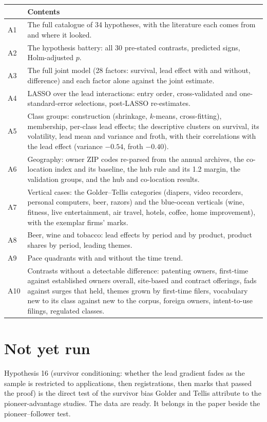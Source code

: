 \begin{longtable}{>{\raggedright\arraybackslash}p{0.8cm}>{\raggedright\arraybackslash}p{12.8cm}}
\toprule
& Contents \\
\midrule
\endhead
A1 & The full catalogue of 34 hypotheses, with the literature each comes from and where it looked. \\
A2 & The hypothesis battery: all 30 pre-stated contrasts, predicted signs, Holm-adjusted $p$. \\
A3 & The full joint model (28 factors: survival, lead effect with and without, difference) and each factor alone against the joint estimate. \\
A4 & LASSO over the lead interactions: entry order, cross-validated and one-standard-error selections, post-LASSO re-estimates. \\
A5 & Class groups: construction (shrinkage, $k$-means, cross-fitting), membership, per-class lead effects; the descriptive clusters on survival, its volatility, lead mean and variance and froth, with their correlations with the lead effect (variance $-0.54$, froth $-0.40$). \\
A6 & Geography: owner ZIP codes re-parsed from the annual archives, the co-location index and its baseline, the hub rule and its 1.2 margin, the validation groups, and the hub and co-location results. \\
A7 & Vertical cases: the Golder--Tellis categories (diapers, video recorders, personal computers, beer, razors) and the blue-ocean verticals (wine, fitness, live entertainment, air travel, hotels, coffee, home improvement), with the exemplar firms' marks. \\
A8 & Beer, wine and tobacco: lead effects by period and by product, product shares by period, leading themes. \\
A9 & Pace quadrants with and without the time trend. \\
A10 & Contrasts without a detectable difference: patenting owners, first-time against established owners overall, site-based and contract offerings, fads against surges that held, themes grown by first-time filers, vocabulary new to its class against new to the corpus, foreign owners, intent-to-use filings, regulated classes. \\
\bottomrule
\end{longtable}

\section*{Not yet run}

Hypothesis 16 (survivor conditioning: whether the lead gradient fades as
the sample is restricted to applications, then registrations, then marks
that passed the proof) is the direct test of the survivor bias Golder and
Tellis attribute to the pioneer-advantage studies. The data are ready. It
belongs in the paper beside the pioneer--follower test.



